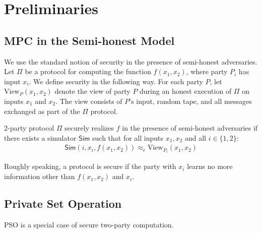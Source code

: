 \documentclass[a4paper,10pt]{article}
\begin{document}
\section{Preliminaries}\label{sec:preliminaries}

\subsection{MPC in the Semi-honest Model}
We use the standard notion of security in the presence of semi-honest adversaries. 
Let $\Pi$ be a protocol for computing the function $f(x_1, x_2)$, where party $P_i$ has input $x_i$. 
We define security in the following way.
For each party $P$, let $\text{View}_P(x_1, x_2)$ denote the view of party $P$ 
during an honest execution of $\Pi$ on inputs $x_1$ and $x_2$. 
The view consists of $P$'s input, random tape, and all messages exchanged as part of the $\Pi$ protocol. 

\begin{definition}
2-party protocol $\Pi$ securely realizes $f$ in the presence of semi-honest adversaries if 
there exists a simulator $\mathsf{Sim}$ such that for all inputs $x_1, x_2$ and all $i \in \{1,2\}$:
\begin{gather*}
\mathsf{Sim}(i, x_i, f(x_1, x_2)) \approx_c \text{View}_{P_i}(x_1, x_2)
\end{gather*}
\end{definition}
Roughly speaking, a protocol is secure if the party with $x_i$ 
learns no more information other than $f(x_1, x_2)$ and $x_i$.  


\subsection{Private Set Operation}\label{subsec:pso}
PSO is a special case of secure two-party computation. 
\end{document}
